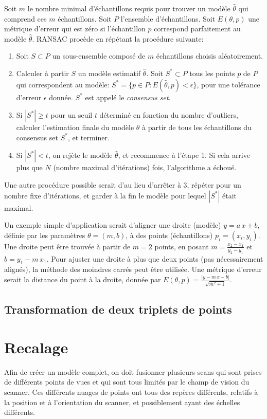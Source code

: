 \documentclass[a4paper,10pt]{scrreprt}
\begin{document}
Soit $m$ le nombre minimal d'échantillons requis pour trouver un modèle $\hat{\theta}$ qui comprend ces $m$ échantillons. Soit $P$ l'ensemble d'échantillons. Soit $E(\theta, p)$ une métrique d'erreur qui est zéro si l'échantillon $p$ correspond parfaitement au modèle $\hat{\theta}$. RANSAC procède en répétant la procédure suivante:
\begin{enumerate}
	\item Soit $S \subset P$ un sous-ensemble composé de $m$ échantillons choisis aléatoirement.
	\item Calculer à partir $S$ un modèle estimatif $\hat{\theta}$. Soit $S^* \subset P$ tous les points $p$ de $P$ qui correspondent au modèle: $S^* = \{ p \in P : E(\hat{\theta}, p) < \epsilon \}$, pour une tolérance d'erreur $\epsilon$ donnée. $S^*$ est appelé le \emph{consensus set}.
	\item Si $|S^*| \geq t$ pour un seuil $t$ déterminé en fonction du nombre d'outliers, calculer l'estimation finale du modèle $\theta$ à partir de tous les échantillons du consensus set $S^*$, et terminer.
	\item Si $|S^*| < t$, on rejète le modèle $\hat{\theta}$, et recommence à l'étape 1. Si cela arrive plus que $N$ (nombre maximal d'itérations) fois, l'algorithme a échoué.
\end{enumerate}
Une autre procédure possible serait d'au lieu d'arrêter à 3, répéter pour un nombre fixe d'itérations, et garder à la fin le modèle pour lequel $|S^*|$ était maximal. 

Un exemple simple d'application serait d'aligner une droite (modèle) $y = a \, x + b$, définie par les paramètres $\theta = (m,b)$, à des points (échantillons) $p_i = (x_i,y_i)$. Une droite peut être trouvée à partir de $m = 2$ points, en posant $m = \frac{x_2 - x_1}{y_2 - y_1}$ et $b = y_1 - m \, x_1$. Pour ajuster une droite à plus que deux points (pas nécessairement alignés), la méthode des moindres carrés peut être utilisée. Une métrique d'erreur serait la distance du point à la droite, donnée par $E(\theta, p) = \frac{|y - m\,x - b|}{\sqrt{m^2 + 1}}$.

\subsection{Transformation de deux triplets de points}


\section{Recalage}
Afin de créer un modèle complet, on doit fusionner plusieurs scans qui sont prises de différents points de vues et qui sont tous limités par le champ de vision du scanner. Ces différents nuages de points ont tous des repères différents, relatifs à la position et à l'orientation du scanner, et possiblement ayant des échelles différents.
\end{document}

